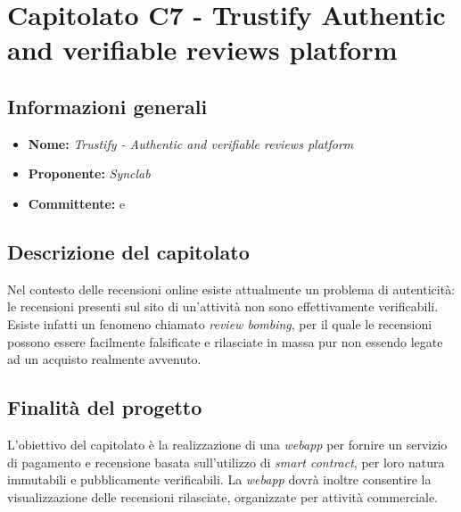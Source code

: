 \section{Capitolato C7 - Trustify Authentic and verifiable reviews platform}\label{section:c7}

\subsection{Informazioni generali}
\begin{itemize}
    \item \textbf{Nome:} \textit{Trustify - Authentic and verifiable reviews platform}
    \item \textbf{Proponente:} \textit{Synclab}
    \item \textbf{Committente:} \commitNameM{} e \commitNameS{}
\end{itemize}

\subsection{Descrizione del capitolato}
Nel contesto delle recensioni online esiste attualmente un problema di autenticità: le recensioni presenti
sul sito di un’attività non sono effettivamente verificabili.
Esiste infatti un fenomeno chiamato \textit{review bombing}, per il quale le recensioni possono essere
facilmente falsificate e rilasciate in massa pur non essendo legate ad un acquisto realmente avvenuto.

\subsection{Finalità del progetto}
L'obiettivo del capitolato è la realizzazione di una \textit{webapp} per fornire un servizio di pagamento
e recensione basata sull'utilizzo di \textit{smart contract}, per loro natura immutabili e pubblicamente verificabili.\newline
La \textit{webapp} dovrà inoltre consentire la visualizzazione delle recensioni rilasciate, organizzate per attività commerciale.

